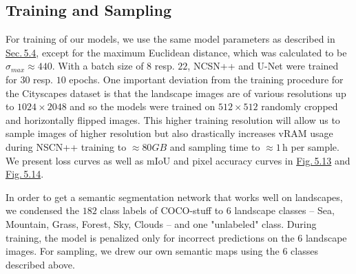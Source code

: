 \subsection{Training and Sampling}
For training of our models, we use the same model parameters as described in \hyperref[sec:5.4]{Sec.\,5.4}, except for the maximum Euclidean distance, which was calculated to be $\sigma_{max}\approx440$. With a batch size of $8$ resp. $22$, NCSN++ and U-Net were trained for $30$ resp. $10$ epochs. One important deviation from the training procedure for the Cityscapes dataset is that the landscape images are of various resolutions up to $1024\times2048$ and so the models were trained on $512\times512$ randomly cropped and horizontally flipped images. This higher training resolution will allow us to sample images of higher resolution but also drastically increases vRAM usage during NSCN++ training to $\approx80GB$ and sampling time to $\approx1$\,h per sample. We present loss curves as well as mIoU and pixel accuracy curves in \hyperref[fig:5.13]{Fig.\,5.13} and \hyperref[fig:5.14]{Fig.\,5.14}.

In order to get a semantic segmentation network that works well on landscapes, we condensed the $182$ class labels of COCO-stuff to $6$ landscape classes – Sea, Mountain, Grass, Forest, Sky, Clouds – and one "unlabeled" class. During training, the model is penalized only for incorrect predictions on the $6$ landscape images. For sampling, we drew our own semantic maps using the $6$ classes described above.

